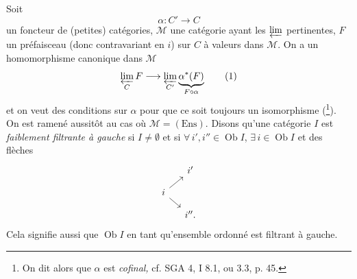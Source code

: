 Soit
\[ \alpha : C' \longrightarrow C \]
un foncteur de (petites) catégories, $\mathcal{M}$ une catégorie ayant les $\varprojlim$ pertinentes, $F$ un préfaisceau (donc contravariant en $i$) sur $C$ à valeurs dans $\mathcal{M}$. On a un homomorphisme canonique dans $\mathcal{M}$
\[ \varprojlim_{C} F \longrightarrow \varprojlim_{C'} \underbrace{\alpha^*(F)}_{F\circ\alpha} \tag*{(1)} \]
et on veut des conditions sur $\alpha$ pour que ce soit toujours un isomorphisme (\footnote{On dit alors que $\alpha$ est \textit{cofinal,} cf. SGA 4, I 8.1, ou 3.3, p. 45.}). On est ramené aussitôt au cas où $\mathcal{M} = (\mathrm{Ens})$. Disons qu'une catégorie $I$ est \textit{faiblement filtrante à gauche} si $I \neq \emptyset$ et si $\forall\, i', i'' \in \operatorname{Ob} I$, $\exists\, i \in \operatorname{Ob} I$ et des flèches
\[
\begin{tikzcd}[row sep=small, column sep=small]
 & i' \\
i \arrow[ur] \arrow[dr] & \\
 & i''.
\end{tikzcd}
\]
Cela signifie aussi que $\operatorname{Ob} I$ en tant qu'ensemble ordonné est filtrant à gauche.

